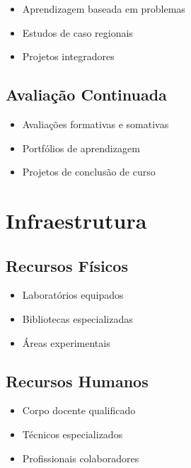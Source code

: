 \documentclass[
  12pt,
  letterpaper,
]{report}
\providecommand{\tightlist}{%
  \setlength{\itemsep}{0pt}\setlength{\parskip}{0pt}}\usepackage{longtable,booktabs,array}
\begin{document}
\begin{itemize}
\tightlist
\item
  Aprendizagem baseada em problemas
\item
  Estudos de caso regionais
\item
  Projetos integradores
\end{itemize}

\subsection{Avaliação Continuada}\label{avaliauxe7uxe3o-continuada}

\begin{itemize}
\tightlist
\item
  Avaliações formativas e somativas
\item
  Portfólios de aprendizagem
\item
  Projetos de conclusão de curso
\end{itemize}

\section{Infraestrutura}\label{infraestrutura}

\subsection{Recursos Físicos}\label{recursos-fuxedsicos}

\begin{itemize}
\tightlist
\item
  Laboratórios equipados
\item
  Bibliotecas especializadas
\item
  Áreas experimentais
\end{itemize}

\subsection{Recursos Humanos}\label{recursos-humanos}

\begin{itemize}
\tightlist
\item
  Corpo docente qualificado
\item
  Técnicos especializados
\item
  Profissionais colaboradores
\end{itemize}

\end{document}

